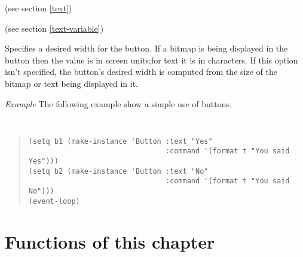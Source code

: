 \begin{ip}
(see section \ref{text})

(see section \ref{text-variable})

Specifies a desired width for the button.  If a bitmap is being displayed in
the button then the value is in screen units;for text it is in characters.  If
this option isn't specified, the button's desired width is computed from the
size of the bitmap or text being displayed in it.

\end {ip}
\noindent
{\em Example}
The following example show a simple use of buttons. 
{\tt 
\begin{quote}
\begin{verbatim}
(setq b1 (make-instance 'Button :text "Yes" 
                                :command '(format t "You said Yes")))
(setq b2 (make-instance 'Button :text "No"
                                :command '(format t "You said No")))
(event-loop)
\end{verbatim}
\end{quote}}


\section {Functions of this chapter}

